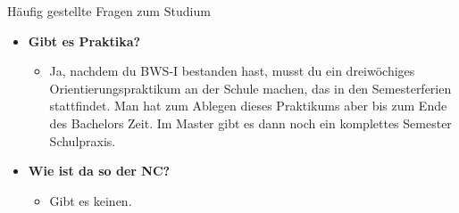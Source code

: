 \begin{block}{Häufig gestellte Fragen zum Studium}
\begin{large}
\begin{itemize}
\item \textbf{Gibt es Praktika?}
\begin{itemize}
	\item Ja, nachdem du BWS-I bestanden hast, musst du ein dreiwöchiges Orientierungspraktikum an der Schule machen, das in den Semesterferien stattfindet. Man hat zum Ablegen dieses Praktikums aber bis zum Ende des Bachelors Zeit. Im Master gibt es dann noch ein komplettes Semester Schulpraxis.
\end{itemize}

\item \textbf{Wie ist da so der NC?}
\begin{itemize}
	\item Gibt es keinen.
\end{itemize}
	\end{itemize}
\end{large}
\end{block}
